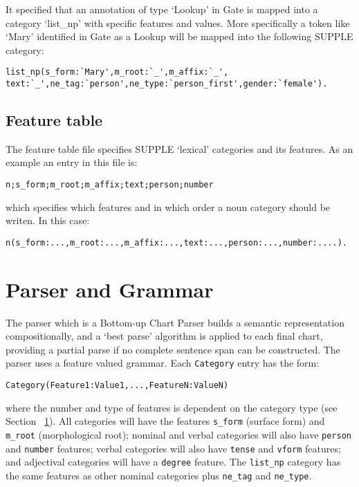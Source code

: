 \documentclass[a4paper,titlepage,openany,twoside]{book}
\begin{document}
It specified that an annotation of type `Lookup' in Gate is mapped
into
a category `list\_np' with specific features and values. More
specifically a token like `Mary' identified in Gate as a Lookup will
be
mapped into the following SUPPLE category: 

\begin{verbatim}
list_np(s_form:`Mary',m_root:`_',m_affix:`_',
text:`_',ne_tag:`person',ne_type:`person_first',gender:`female').
\end{verbatim}



\section{Feature table}
\label{sec:features}

The feature table file specifies SUPPLE `lexical' categories and its
features.  As an example an entry in this file is:

\begin{verbatim}
n;s_form;m_root;m_affix;text;person;number
\end{verbatim}


which specifies which features and in which order a noun category
should be writen. In this case:

\begin{verbatim}
n(s_form:...,m_root:...,m_affix:...,text:...,person:...,number:....).
\end{verbatim}

\chapter{Parser and Grammar}
\label{sec:grammar}

The parser which is a Bottom-up Chart Parser builds a semantic representation
compositionally, and a `best parse' algorithm is applied to each final
chart, providing a partial parse if no complete sentence span can be
constructed. The parser uses a feature valued grammar.  Each \texttt{Category} entry has the form:
\begin{verbatim}
Category(Feature1:Value1,...,FeatureN:ValueN)
\end{verbatim}
where the number and type of features is dependent on the category
type (see Section ~\ref{sec:features}).  All categories will have the features \texttt{s\_form} (surface
form) and \texttt{m\_root} (morphological root); nominal and verbal
categories will also have \texttt{person} and \texttt{number}
features; verbal categories will also have \texttt{tense} and
\texttt{vform} features; and adjectival categories will have a
\texttt{degree} feature.  The \texttt{list\_np} category has the same
features as other nominal categories plus \texttt{ne\_tag} and
\texttt{ne\_type}.\\
\end{document}
